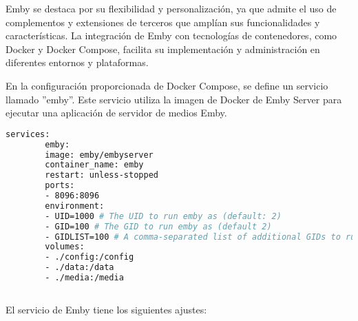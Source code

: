 		Emby se destaca por su flexibilidad y personalización, ya que admite el uso de complementos y extensiones de terceros que amplían sus funcionalidades y características. La integración de Emby con tecnologías de contenedores, como Docker y Docker Compose, facilita su implementación y administración en diferentes entornos y plataformas.
		
			
		En la configuración proporcionada de Docker Compose, se define un servicio llamado ''emby''. Este servicio utiliza la imagen de Docker de Emby Server para ejecutar una aplicación de servidor de medios Emby.\par
		
		\begin{lstlisting}[language=bash, caption=docker compose]
		services:
		emby:
		image: emby/embyserver
		container_name: emby
		restart: unless-stopped
		ports:
		- 8096:8096
		environment:
		- UID=1000 # The UID to run emby as (default: 2)
		- GID=100 # The GID to run emby as (default 2)
		- GIDLIST=100 # A comma-separated list of additional GIDs to run emby as (default: 2)
		volumes:
		- ./config:/config
		- ./data:/data
		- ./media:/media
		
		\end{lstlisting}		
	
		El servicio de Emby tiene los siguientes ajustes:
	
